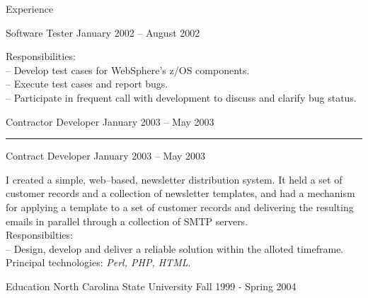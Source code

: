 \documentclass[letterpaper, 11pt]{article}
\begin{document}
\begin{resume}
\begin{category}{Experience}
\begin{block}
                \smallskip
            \end{block}
            \begin{block}
                 {Software Tester}
                         { }                {January 2002 -- August 2002}
                \par
                Responsibilities: \\
                -- Develop test cases for WebSphere's z/OS components. \\
                -- Execute test cases and report bugs. \\
                -- Participate in frequent call with development to discuss and clarify bug status.
                \bigskip
            \end{block}
             {Contractor Developer}
                     {}               {January 2003 -- May 2003}
            \rule{\textwidth}{1pt}
            \begin{block}
                 {Contract Developer}
                         { }                              {January 2003 -- May 2003}
                \par
                I created a simple, web--based, newsletter distribution system.
                It held a set of customer records and a collection of newsletter templates,
                and had a mechanism for applying a template to a set of customer records and
                delivering the resulting emails in parallel through a collection of SMTP servers.
                \\[1ex]
                Responsibilties: \\
                -- Design, develop and deliver a reliable solution within the alloted timeframe.
                \\[1ex]
                Principal technologies: \emph{Perl, PHP, HTML}.
            \end{block}
        \end{category}
        \begin{category}{Education}
             {North Carolina State University}
                     { }                        {Fall 1999 - Spring 2004}
        \end{category}
    \end{resume}
\end{document}
